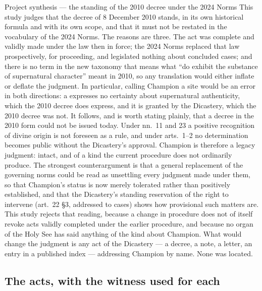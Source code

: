 \begin{judgmentbox}{Project synthesis --- the standing of the 2010
decree under the 2024 Norms}
This study judges that the decree of 8 December 2010 stands, in its own
historical formula and with its own scope, and that it must not be
restated in the vocabulary of the 2024 Norms. The reasons are three.
The act was complete and validly made under the law then in force; the
2024 Norms replaced that law prospectively, for proceeding, and legislated
nothing about concluded cases; and there is no term in the new taxonomy
that means what ``do exhibit the substance of supernatural character''
meant in 2010, so any translation would either inflate or deflate the
judgment. In particular, calling Champion a  site
would be an error in both directions: a  expresses
no certainty about supernatural authenticity, which the 2010 decree
does express, and it is granted by the Dicastery, which the 2010 decree
was not.\jsep
It follows, and is worth stating plainly, that a decree in the 2010
form could not be issued today. Under nn.~11 and 23 a positive
recognition of divine origin is not foreseen as a rule, and under
arts.~1--2 no determination becomes public without the Dicastery's
approval. Champion is therefore a legacy judgment: intact, and of a
kind the current procedure does not ordinarily produce.\jsep
The strongest counterargument is that a general replacement of the
governing norms could be read as unsettling every judgment made under
them, so that Champion's status is now merely tolerated rather than
positively established, and that the Dicastery's standing reservation
of the right to intervene (art.~22 §3, addressed to 
cases) shows how provisional such matters are. This study rejects that
reading, because a change in procedure does not of itself revoke acts
validly completed under the earlier procedure, and because no organ of
the Holy See has said anything of the kind about Champion. What would
change the judgment is any act of the Dicastery --- a decree, a note, a
letter, an entry in a published index --- addressing Champion by name.
None was located.
\end{judgmentbox}

\subsection{The acts, with the witness used for each}


